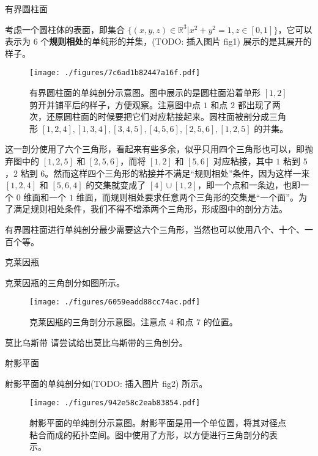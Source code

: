 \begin{example}{有界圆柱面}

考虑一个圆柱体的表面，即集合 $\{(x, y, z)\in\mathbb{R}^3|x^2+y^2=1, z\in [0, 1]\}$，它可以表示为 $6$ 个\textbf{规则相处}的单纯形的并集，(TODO: 插入图片 fig1) 展示的是其展开的样子。

\begin{figure}[ht]
\centering
\texttt{[image: ./figures/7c6ad1b82447a16f.pdf]}
\caption{有界圆柱面的单纯剖分示意图。图中展示的是圆柱面沿着单形 $[1, 2]$ 剪开并铺平后的样子，方便观察。注意图中点 $1$ 和点 $2$ 都出现了两次，还原圆柱面的时候要把它们对应粘接起来。圆柱面被剖分成三角形 $[1,2,4], [1,3,4], [3,4,5], [4,5,6], [2,5,6], [1,2,5]$ 的并集。} \label{fig_SimCom_3}
\end{figure}


这一剖分使用了六个三角形，看起来有些多余，似乎只用四个三角形也可以，即抛弃图中的 $[1,2,5]$ 和 $[2,5,6]$，而将 $[1, 2]$ 和 $[5, 6]$ 对应粘接，其中 $1$ 粘到 $5$，$2$ 粘到 $6$。然而这样四个三角形的粘接并不满足“规则相处”条件，因为这样一来 $[1, 2, 4]$ 和 $[5, 6, 4]$ 的交集就变成了 $[4]\cup[1, 2]$，即一个点和一条边，也即一个 $0$ 维面和一个 $1$ 维面，而规则相处要求任意两个三角形的交集是“一个面”。为了满足规则相处条件，我们不得不增添两个三角形，形成图中的剖分方法。



有界圆柱面进行单纯剖分最少需要这六个三角形，当然也可以使用八个、十个、一百个等。

\end{example}


\begin{example}{克莱因瓶}

克莱因瓶的三角剖分如图所示。

\begin{figure}[ht]
\centering
\texttt{[image: ./figures/6059eadd88cc74ac.pdf]}
\caption{克莱因瓶的三角剖分示意图。注意点 $4$ 和点 $7$ 的位置。} \label{fig_SimCom_5}
\end{figure}

\end{example}


\begin{exercise}{莫比乌斯带}
请尝试给出莫比乌斯带的三角剖分。
\end{exercise}


\begin{example}{射影平面}

射影平面的单纯剖分如(TODO: 插入图片 fig2) 所示。

\begin{figure}[ht]
\centering
\texttt{[image: ./figures/942e58c2eab83854.pdf]}
\caption{射影平面的单纯剖分示意图。射影平面是用一个单位圆，将其对径点粘合而成的拓扑空间。图中使用了方形，以方便进行三角剖分的表示。} \label{fig_SimCom_4}
\end{figure}

\end{example}


